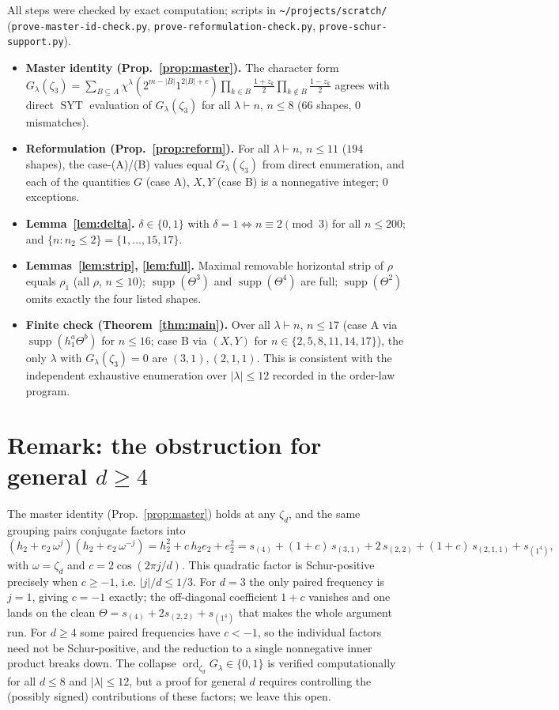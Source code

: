 \documentclass[11pt]{article}
\theoremstyle{definition}
\theoremstyle{remark}
\DeclareMathOperator{\SYT}{SYT}
\DeclareMathOperator{\ord}{ord}
\DeclareMathOperator{\supp}{supp}
\newcommand{\la}{\lambda}
\newcommand{\zt}{\zeta_3}
\begin{document}
All steps were checked by exact computation; scripts in
\texttt{\~{}/projects/scratch/} (\texttt{prove-master-id-check.py},
\texttt{prove-reformulation-check.py}, \texttt{prove-schur-support.py}).
\begin{itemize}
\item \textbf{Master identity (Prop.~\ref{prop:master}).} The character form
$G_\la(\zt)=\sum_{B\subseteq A}\chi^\la(2^{m-|B|}1^{2|B|+e})\prod_{k\in B}\frac{1+z_k}{2}
\prod_{k\notin B}\frac{1-z_k}{2}$ agrees with direct $\SYT$ evaluation of $G_\la(\zt)$
for all $\la\vdash n$, $n\le8$ ($66$ shapes, $0$ mismatches).
\item \textbf{Reformulation (Prop.~\ref{prop:reform}).} For all $\la\vdash n$, $n\le11$
($194$ shapes), the case-(A)/(B) values equal $G_\la(\zt)$ from direct enumeration, and
each of the quantities $G$ (case A), $X,Y$ (case B) is a nonnegative integer; $0$
exceptions.
\item \textbf{Lemma~\ref{lem:delta}.} $\delta\in\{0,1\}$ with $\delta=1\iff n\equiv2
\pmod3$ for all $n\le200$; and $\{n:n_2\le2\}=\{1,\dots,15,17\}$.
\item \textbf{Lemmas~\ref{lem:strip}, \ref{lem:full}.} Maximal removable horizontal
strip of $\rho$ equals $\rho_1$ (all $\rho$, $n\le10$); $\supp(\Theta^{3})$ and
$\supp(\Theta^{4})$ are full; $\supp(\Theta^{2})$ omits exactly the four listed shapes.
\item \textbf{Finite check (Theorem~\ref{thm:main}).} Over all $\la\vdash n$, $n\le17$
(case A via $\supp(h_1^{a}\Theta^{b})$ for $n\le16$; case B via $(X,Y)$ for
$n\in\{2,5,8,11,14,17\}$), the only $\la$ with $G_\la(\zt)=0$ are $(3,1),(2,1,1)$. This
is consistent with the independent exhaustive enumeration over $|\la|\le12$ recorded in
the order-law program.
\end{itemize}

\section{Remark: the obstruction for general $d\ge4$}

The master identity (Prop.~\ref{prop:master}) holds at any $\zeta_d$, and the same
grouping pairs conjugate factors into
\[
  (h_2+e_2\,\omega^{j})(h_2+e_2\,\omega^{-j})=h_2^2+c\,h_2e_2+e_2^2
   =s_{(4)}+(1+c)\,s_{(3,1)}+2\,s_{(2,2)}+(1+c)\,s_{(2,1,1)}+s_{(1^4)},
\]
with $\omega=\zeta_d$ and $c=2\cos(2\pi j/d)$. This quadratic factor is Schur-positive
precisely when $c\ge-1$, i.e. $|j|/d\le 1/3$. For $d=3$ the only paired frequency is
$j=1$, giving $c=-1$ exactly; the off-diagonal coefficient $1+c$ vanishes and one lands
on the clean $\Theta=s_{(4)}+2s_{(2,2)}+s_{(1^4)}$ that makes the whole argument run.
For $d\ge4$ some paired frequencies have $c<-1$, so the individual factors need not be
Schur-positive, and the reduction to a single nonnegative inner product breaks down. The
collapse $\ord_{\zeta_d}G_\la\in\{0,1\}$ is verified computationally for all $d\le8$ and
$|\la|\le12$, but a proof for general $d$ requires controlling the (possibly signed)
contributions of these factors; we leave this open.
\end{document}

